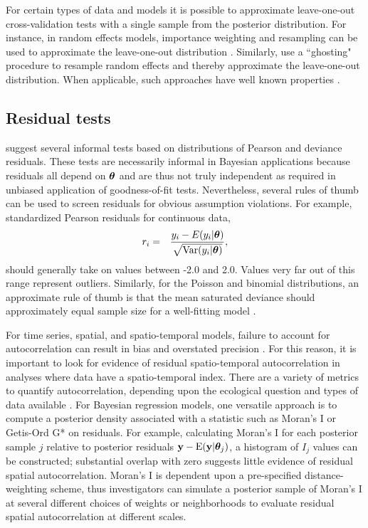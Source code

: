 \documentclass[12pt,english]{article}
\begin{document}
\begin{spacing}{1.9}
For certain types of data and models it is possible to approximate
leave-one-out cross-validation tests with a single sample from the
posterior distribution.  For instance, in random effects models,
importance weighting and resampling can be used to approximate the
leave-one-out distribution
\citep{SternCressie2000,QiuEtAl2016}. Similarly,
\citet{MarshallSpiegelhalter2007} use a ``ghosting" procedure to
resample random effects and thereby approximate the leave-one-out
distribution.  When applicable, such approaches have well known
properties \citep[i.e., a uniform distribution of p-values under the
null;][]{QiuEtAl2016}.

\subsection{Residual tests}

\citet{LunnEtAl2013} suggest several informal tests based on
distributions of Pearson and deviance residuals.  These tests are
necessarily informal in Bayesian applications because residuals all
depend on $\boldsymbol{\theta}$ and are thus not truly independent as required in
unbiased application of goodness-of-fit tests.  Nevertheless, several
rules of thumb can be used to screen residuals for obvious assumption
violations.  For example, standardized Pearson residuals for
continuous data,
\begin{eqnarray*}
  r_i & = & \frac{y_i - E(y_i|\boldsymbol{\theta})}{\sqrt{\textrm{Var}(y_i | \boldsymbol{\theta})}},
\end{eqnarray*}
should generally take on values between -2.0 and 2.0.  Values very far
out of this range represent outliers.  Similarly, for the Poisson and
binomial distributions, an approximate rule of thumb is that the mean
saturated deviance should approximately equal sample size for a
well-fitting model \citep{LunnEtAl2013}.

For time series, spatial, and spatio-temporal models, failure to
account for autocorrelation can result in bias and overstated
precision \citep{LichsteinEtAl2002}.  For this reason, it is important
to look for evidence of residual spatio-temporal autocorrelation in
analyses where data have a spatio-temporal index.  There are a variety
of metrics to quantify autocorrelation, depending upon the ecological
question and types of data available \cite[e.g.,][]{PerryEtAl2002}.
For Bayesian regression models, one versatile approach is to compute a
posterior density associated with a statistic such as Moran's I
\citep{Moran1950} or Getis-Ord G* \citep{GetisOrd1992} on residuals.
For example, calculating Moran's I for each posterior sample $j$
relative to posterior residuals
${\bf y} - \textrm{E}({\bf y} | \boldsymbol{\theta}_j)$, a histogram
of $I_j$ values can be constructed; substantial overlap with zero
suggests little evidence of residual spatial autocorrelation.  Moran's
I is dependent upon a pre-specified distance-weighting scheme, thus
investigators can simulate a posterior sample of Moran's I at several
different choices of weights or neighborhoods to evaluate residual
spatial autocorrelation at different scales.


\end{spacing}
\end{document}

